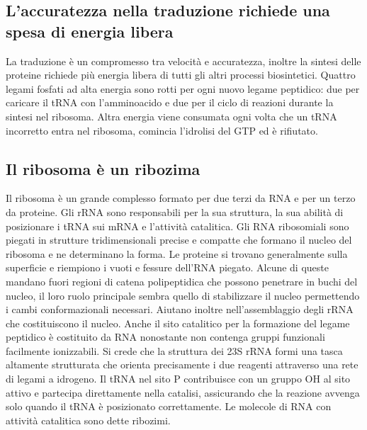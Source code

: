 \subsection{L'accuratezza nella traduzione richiede una spesa di energia libera}
La traduzione \`e un compromesso tra velocit\`a e accuratezza, inoltre la sintesi delle proteine richiede pi\`u energia libera di tutti gli altri processi biosintetici. Quattro legami
fosfati ad alta energia sono rotti per ogni nuovo legame peptidico: due per caricare il tRNA con l'amminoacido e due per il ciclo di reazioni durante la sintesi nel ribosoma. Altra
energia viene consumata ogni volta che un tRNA incorretto entra nel ribosoma, comincia l'idrolisi del GTP ed \`e rifiutato. 
\subsection{Il ribosoma \`e un ribozima}
Il ribosoma \`e un grande complesso formato per due terzi da RNA e per un terzo da proteine. Gli rRNA sono responsabili per la sua struttura, la sua abilit\`a di posizionare i tRNA sui 
mRNA e l'attivit\`a catalitica. Gli RNA ribosomiali sono piegati in strutture tridimensionali precise e compatte che formano il nucleo del ribosoma e ne determinano la forma. Le proteine
si trovano generalmente sulla superficie e riempiono i vuoti e fessure dell'RNA piegato. Alcune di queste mandano fuori regioni di catena polipeptidica che possono penetrare in buchi 
del nucleo, il loro ruolo principale sembra quello di stabilizzare il nucleo permettendo i cambi conformazionali necessari. Aiutano inoltre nell'assemblaggio degli rRNA che costituiscono
il nucleo. Anche il sito catalitico per la formazione del legame peptidico \`e costituito da RNA nonostante non contenga gruppi funzionali facilmente ionizzabili. Si crede che la 
struttura dei 23S rRNA formi una tasca altamente strutturata che orienta precisamente i due reagenti attraverso una rete di legami a idrogeno. Il tRNA nel sito P contribuisce con un
gruppo OH al sito attivo e partecipa direttamente nella catalisi, assicurando che la reazione avvenga solo quando il tRNA \`e posizionato correttamente. Le molecole di RNA con attivit\`a
catalitica sono dette ribozimi. 
